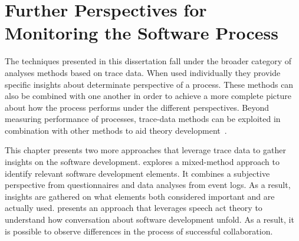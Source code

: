\chapter{Further Perspectives for Monitoring the Software Process}


% 
%
%
%

The techniques presented in this dissertation fall under the broader category of analyses methods based on trace data. When used individually they provide specific insights about determinate perspective of a process. These methods can also be combined with one another in order to achieve a more complete picture about how the process performs under the different perspectives. Beyond measuring performance of processes, trace-data methods can be exploited in combination with other methods to aid theory development~\citep{DBLP:journals/isr/BerenteSS19}.

This chapter presents two more approaches that leverage trace data to gather insights on the software development.  explores a mixed-method approach to identify relevant software development elements. It combines a subjective perspective from questionnaires and data analyses from event logs. As a result, insights are gathered on what elements both considered important and are actually used.  presents an approach that leverages speech act theory to understand how conversation about software development unfold. As a result, it is possible to observe differences in the process of successful collaboration. 



